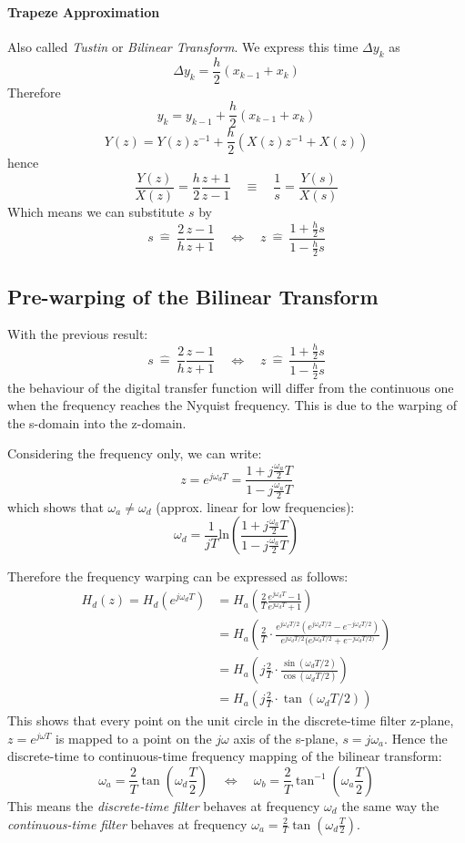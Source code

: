 \documentclass[10pt,a4paper]{article}
\begin{document}
\paragraph{Trapeze Approximation}
Also called \emph{Tustin} or \emph{Bilinear Transform}. We express this time $\Delta y_k$ as 
$$
\Delta y_k = \frac{h}{2}(x_{k-1} + x_k)
$$
Therefore
$$
y_k = y_{k-1} + \frac{h}{2}(x_{k-1} + x_k)
$$
$$
Y(z) = Y(z)z^{-1} + \frac{h}{2}(X(z)z^{-1} + X(z))
$$
hence
$$
\frac{Y(z)}{X(z)} = \frac{h}{2} \frac{z+1}{z-1} \quad \equiv \quad \frac{1}{s} = \frac{Y(s)}{X(s)}
$$
Which means we can substitute $s$ by
$$
\boxed{
s \: \hat{=} \: \frac{2}{h} \frac{z-1}{z+1} \quad \Leftrightarrow \quad 
z \: \hat{=} \: \frac{1 + \frac{h}{2}s}{1 - \frac{h}{2}s} 
}
$$
\subsection{Pre-warping of the Bilinear Transform}
With the previous result:
$$
s \: \hat{=} \: \frac{2}{h} \frac{z-1}{z+1} \quad \Leftrightarrow \quad 
z \: \hat{=} \: \frac{1 + \frac{h}{2}s}{1 - \frac{h}{2}s} 
$$
the behaviour of the digital transfer function will differ from the continuous one when the frequency reaches the Nyquist frequency. This is due to the warping of the s-domain into the z-domain. 

Considering the frequency only, we can write:
$$
z = e^{j\omega_d T} = \frac{1+j\frac{\omega_a}{2} T}{1-j\frac{\omega_a}{2} T}
$$
which shows that $\omega_a \neq \omega_d$ (approx. linear for low frequencies):
$$
\omega_d = \frac{1}{jT} \text{ln}\left(\frac{1+j\frac{\omega_a}{2} T}{1-j\frac{\omega_a}{2} T}\right)
$$

Therefore the frequency warping can be expressed as follows:
\begin{align*}
H_d(z) = H_d(e^{j\omega_d T}) 
	  &= H_a\left(\frac{2}{T} \frac{e^{j\omega_d T}-1}{e^{j\omega_d T}+1}\right) \\
	  &= H_a\left(\frac{2}{T} \cdot \frac{e^{j\omega_d T/2}(e^{j\omega_d T/2}-e^{-j\omega_d T/2})}
	  									 {e^{j\omega_d T/2}(e^{j\omega_d T/2}+e^{-j\omega_d T/2)}}\right) \\
	  &= H_a\left(j\frac{2}{T} \cdot \frac{\sin(\omega_d T/2)}{\cos(\omega_d T/2)}\right) \\
	  &= H_a\left(j\frac{2}{T} \cdot \tan(\omega_d T/2)\right)
\end{align*}
This shows that every point on the unit circle in the discrete-time filter z-plane, $z=e^{j\omega T}$ is mapped to a point on the $j\omega$ axis of the s-plane, $s=j\omega_a$. Hence the discrete-time to continuous-time frequency mapping of the bilinear transform:
$$
\boxed{
\omega_a = \frac{2}{T} \tan\left( \omega_d \frac{T}{2} \right) \quad \Leftrightarrow \quad
\omega_b = \frac{2}{T} \tan^{-1}\left( \omega_a \frac{T}{2} \right)
}
$$
This means the \emph{discrete-time filter} behaves at frequency $\omega_d$ the same way the \emph{continuous-time filter} behaves at frequency $\omega_a = \frac{2}{T} \tan\left( \omega_d \frac{T}{2} \right)$. 
\end{document}
